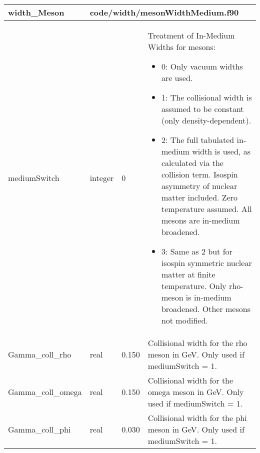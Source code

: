 \documentclass{article}
\begin{document}
\begin{longtable}{llll}
\toprule
\textbf{\large{width\_Meson}} & \multicolumn{3}{l}{\footnotesize{code/width/mesonWidthMedium.f90}}\\*
\midrule
\endfirsthead
\midrule
\endhead
mediumSwitch & \begin{minipage}[t]{2cm}integer\end{minipage} & \begin{minipage}[t]{2cm}0\end{minipage} & \begin{minipage}[t]{12cm}Treatment of In-Medium Widths for mesons:\begin{itemize}\leftmargin0em\itemindent0pt\item 0: Only vacuum widths are used.\item 1: The collisional width is assumed to be constant   (only density-dependent).\item 2: The full tabulated in-medium width is used, as   calculated via the collision term. Isospin asymmetry of nuclear matter included.   Zero temperature assumed. All mesons are in-medium broadened.\item 3: Same as 2 but for isospin symmetric nuclear matter at finite temperature.   Only rho-meson is in-medium broadened. Other mesons not modified. \end{itemize}\end{minipage}\\*
\midrule
Gamma\_coll\_rho & \begin{minipage}[t]{2cm}real\end{minipage} & \begin{minipage}[t]{2cm}0.150\end{minipage} & \begin{minipage}[t]{12cm}Collisional width for the rho meson in GeV. Only used if mediumSwitch = 1.\end{minipage}\\*
\midrule
Gamma\_coll\_omega & \begin{minipage}[t]{2cm}real\end{minipage} & \begin{minipage}[t]{2cm}0.150\end{minipage} & \begin{minipage}[t]{12cm}Collisional width for the omega meson in GeV. Only used if mediumSwitch = 1.\end{minipage}\\*
\midrule
Gamma\_coll\_phi & \begin{minipage}[t]{2cm}real\end{minipage} & \begin{minipage}[t]{2cm}0.030\end{minipage} & \begin{minipage}[t]{12cm}Collisional width for the phi meson in GeV. Only used if mediumSwitch = 1.\end{minipage}\\*

\end{longtable}
\end{document}
